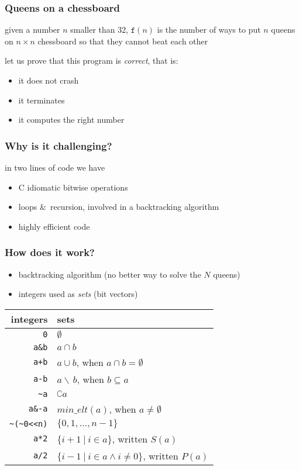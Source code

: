 \documentclass[compress]{beamer}
\newcommand{\minelt}[1]{\ensuremath{\mathit{min\_elt}(#1)}}
\begin{document}
\begin{frame}
  \frametitle{Queens on a chessboard}

given a number $n$ smaller than 32, 
$\mathtt{f}(n)$ is the number of ways to put $n$ queens on $n\times n$
chessboard so that they cannot beat each other

\Pause

let us prove that this program is \emph{correct}, that is:
\begin{itemize}
\item it does not crash
\item it terminates
\item it computes the right number
\end{itemize}
\end{frame}

\begin{frame}
  \frametitle{Why is it challenging?}
  in two lines of code we have
  \begin{itemize}
  \item C idiomatic bitwise operations
  \item loops \&\ recursion, involved in a backtracking algorithm
  \item highly efficient code
  \end{itemize}
\end{frame}

\begin{frame}[fragile]
  \frametitle{How does it work?}
  \begin{itemize}
  \item backtracking algorithm (no better way to solve the $N$ queens)
  \item integers used as \emph{sets} (bit vectors)
  \end{itemize}
  \pause
  \begin{center}
    \begin{tabular}{r|l}
      integers & sets \\\hline
    \verb!0! & $\emptyset$ \\
   \verb!a&b! & $a\cap b$ \\
       \verb!a+b! & $a\cup b$, \quad when $a\cap b=\emptyset$ \\
       \verb!a-b! & $a\backslash\,b$, \quad when $b\subseteq a$ \\
     \verb!~a! & $\complement a$ \\
     \verb!a&-a! & $\minelt{a}$, \quad when $a\not=\emptyset$ \\
     \verb!~(~0<<n)! & $\{0,1,\dots,n-1\}$ \\
     \verb!a*2! & $\{i+1~|~i\in a\}$, \quad written $S(a)$ \\
     \verb!a/2! & $\{i-1~|~i\in a \land i\not=0\}$, \quad written $P(a)$ \\
    \end{tabular}
  \end{center}
\end{frame}
\end{document}
